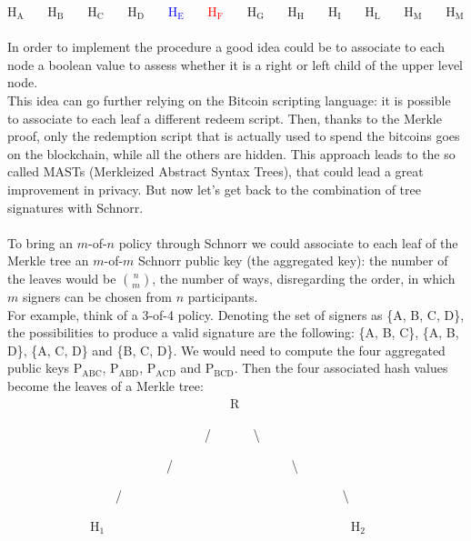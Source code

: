 H$_\text{A}$ \ \ \ H$_\text{B}$ \ \ \ H$_\text{C}$ \ \ \ H$_\text{D}$ \ \ \ \textcolor{blue}{H$_\text{E}$} \ \ \ \textcolor{red}{H$_\text{F}$} \ \ \ H$_\text{G}$ \ \ \ H$_\text{H}$ \ \ \ H$_\text{I}$ \ \ \ H$_\text{L}$ \ \ \ H$_\text{M}$ \ \ \ H$_\text{M}$
\\
\\
In order to implement the procedure a good idea could be to associate to each node a boolean value to assess whether it is a right or left child of the upper level node.
\\
This idea can go further relying on the Bitcoin scripting language: it is possible to associate to each leaf a different redeem script. Then, thanks to the Merkle proof, only the redemption script that is actually used to spend the bitcoins goes on the blockchain, while all the others are hidden. This approach leads to the so called MASTs (Merkleized Abstract Syntax Trees), that could lead a great improvement in privacy. But now let's get back to the combination of tree signatures with Schnorr.
\\
\\
To bring an $m$-of-$n$ policy through Schnorr we could associate to each leaf of the Merkle tree an $m$-of-$m$ Schnorr public key (the aggregated key): the number of the leaves would be ${n\choose m}$, the number of ways, disregarding the order, in which $m$ signers can be chosen from $n$ participants.
\\
For example, think of a 3-of-4 policy. Denoting the set of signers as \{A, B, C, D\}, the possibilities to produce a valid signature are the following: \{A, B, C\}, \{A, B, D\}, \{A, C, D\} and \{B, C, D\}. We would need to compute the four aggregated public keys P$_\text{ABC}$, P$_\text{ABD}$, P$_\text{ACD}$ and P$_\text{BCD}$. Then the four associated hash values become the leaves of a Merkle tree:
\\

\ \ \ \ \ \ \ \ \ \ \ \ \ \ \ \ \ \ \ \ \ \ \ \ \ \ \ \ \ \ \ \ \ \ \ R

\ \ \ \ \ \ \ \ \ \ \ \ \ \ \ \ \ \ \ \ \ \ \ \ \ \ \ \ \ \ \ / \ \ \ \ \ \ \textbackslash

\ \ \ \ \ \ \ \ \ \ \ \ \ \ \ \ \ \ \ \ \ \ \ \ \ / \ \ \ \ \ \ \ \ \ \ \ \ \ \ \ \ \ \ \textbackslash

\ \ \ \ \ \ \ \ \ \ \ \ \ \ \ \ \ / \ \ \ \ \ \ \ \ \ \ \ \ \ \ \ \ \ \ \ \ \ \ \ \ \ \ \ \ \ \ \ \ \ \ \textbackslash

\ \ \ \ \ \ \ \ \ \ \ \ \ H$_1$ \ \ \ \ \ \ \ \ \ \ \ \ \ \ \ \ \ \ \ \ \ \ \ \ \ \ \ \ \ \ \ \ \ \ \ \ \ \ H$_2$

